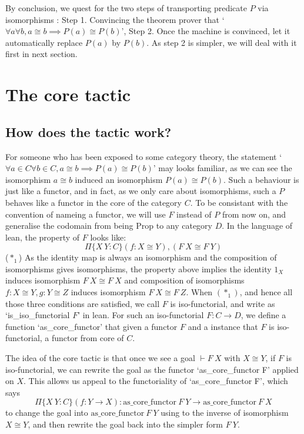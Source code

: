\documentclass[11pt]{article}
\begin{document}
By conclusion, we quest for the two steps of transporting predicate $P$ via isomorphisms : Step 1. Convincing the theorem prover that `$\forall a\forall b, a \cong b \implies P(a)\cong P(b)$', Step 2. Once the machine is convinced, let it automatically replace $P(a)$ by $P(b)$. As step 2 is simpler, we will deal with it first in next section.

\section{The core tactic}
\subsection{How does the tactic work?}

For someone who has been exposed to some category theory, the statement `$\forall a\in C\forall b\in C, a \cong b \implies P(a)\cong P(b)$' may looks familiar, as we can see the isomorphism $a\cong b$ induced an isomorphism $P(a)\cong P(b)$. Such a behaviour is just like a functor, and in fact, as we only care about isomorphisms, such a $P$ behaves like a functor in the core of the category $C$. To be consistant with the convention of nameing a functor, we will use $F$ instead of $P$ from now on, and generalise the codomain from being $\text{Prop}$ to any category $D$. In the language of lean, the property of $F$ looks like:
\[\Pi \{X \ Y : C\} (f : X\cong Y), (F \  X \cong F \ Y)\] ($*_1$)
As the identity map is always an isomorphism and the composition of isomorphisms gives isomorphisms, the property above implies the identity $1_X$ induces isomorphism $F \ X \cong F \ X$ and composition of isomorphisms $f: X \cong Y,g: Y \cong Z$ induces isomorphism $F \ X \cong F \ Z$. When $(*_1)$, and hence all those three conditions are satisfied, we call $F$ is iso-functorial, and write as `is\_iso\_functorial $F$' in lean. For such an iso-functorial $F : C \to D$, we define a function `as\_core\_functor' that given a functor $F$ and a instance that $F$ is iso-functorial, a functor from core of $C$.

The idea of the core tactic is that once we see a goal $\vdash F \ X$ with $X\cong Y$, if $F$ is iso-functorial, we can rewrite the goal as the functor `as\_core\_functor F' applied on $X$. This allows us appeal to the functoriality of `as\_core\_functor F', which says 
\[\Pi \{X \ Y : C\} (f:Y \longrightarrow X) : \text{as\_core\_functor} \  F \ Y \longrightarrow \text{as\_core\_functor} \ F \ X \] 
to change the goal into $\text{as\_core\_functor} \  F \ Y$ using to the inverse of isomorphism $X\cong Y$, and then rewrite the goal back into the simpler form $F \ Y$.
\end{document}

